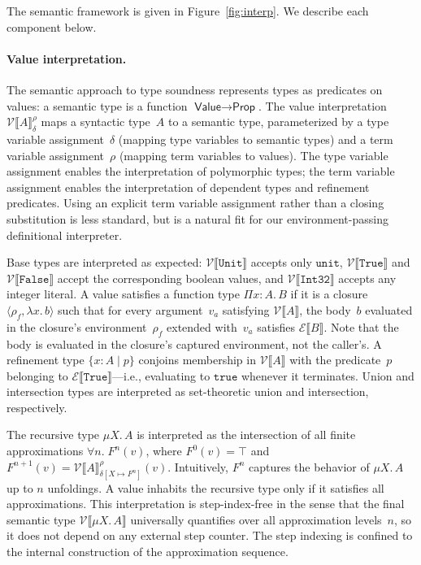 \documentclass[acmsmall]{acmart}
\begin{document}
The semantic framework is given in Figure~\ref{fig:interp}. We describe each component below.

\paragraph{Value interpretation.}
The semantic approach to type soundness represents types as predicates on values: a semantic type is a function $\textsf{Value} \to \textsf{Prop}$. The value interpretation $\mathcal{V}\llbracket A \rrbracket_{\delta}^{\rho}$ maps a syntactic type~$A$ to a semantic type, parameterized by a type variable assignment~$\delta$ (mapping type variables to semantic types) and a term variable assignment~$\rho$ (mapping term variables to values). The type variable assignment enables the interpretation of polymorphic types; the term variable assignment enables the interpretation of dependent types and refinement predicates. Using an explicit term variable assignment rather than a closing substitution is less standard, but is a natural fit for our environment-passing definitional interpreter.

Base types are interpreted as expected: $\mathcal{V}\llbracket \texttt{Unit} \rrbracket$ accepts only $\texttt{unit}$, $\mathcal{V}\llbracket \texttt{True} \rrbracket$ and $\mathcal{V}\llbracket \texttt{False} \rrbracket$ accept the corresponding boolean values, and $\mathcal{V}\llbracket \texttt{Int32} \rrbracket$ accepts any integer literal. A value satisfies a function type $\Pi x{:}A.\, B$ if it is a closure $\langle \rho_f, \lambda x.\, b \rangle$ such that for every argument~$v_a$ satisfying $\mathcal{V}\llbracket A \rrbracket$, the body~$b$ evaluated in the closure's environment~$\rho_f$ extended with~$v_a$ satisfies $\mathcal{E}\llbracket B \rrbracket$. Note that the body is evaluated in the closure's captured environment, not the caller's. A refinement type $\{x : A \mid p\}$ conjoins membership in $\mathcal{V}\llbracket A \rrbracket$ with the predicate~$p$ belonging to $\mathcal{E}\llbracket \texttt{True} \rrbracket$---i.e., evaluating to $\texttt{true}$ whenever it terminates. Union and intersection types are interpreted as set-theoretic union and intersection, respectively.

The recursive type $\mu X.\, A$ is interpreted as the intersection of all finite approximations $\forall n.\; F^n(v)$, where $F^0(v) = \top$ and $F^{n+1}(v) = \mathcal{V}\llbracket A \rrbracket_{\delta[X \mapsto F^n]}^{\rho}(v)$. Intuitively, $F^n$ captures the behavior of $\mu X.\, A$ up to $n$ unfoldings. A value inhabits the recursive type only if it satisfies all approximations. This interpretation is step-index-free in the sense that the final semantic type $\mathcal{V}\llbracket \mu X.\, A \rrbracket$ universally quantifies over all approximation levels~$n$, so it does not depend on any external step counter. The step indexing is confined to the internal construction of the approximation sequence.
\end{document}
